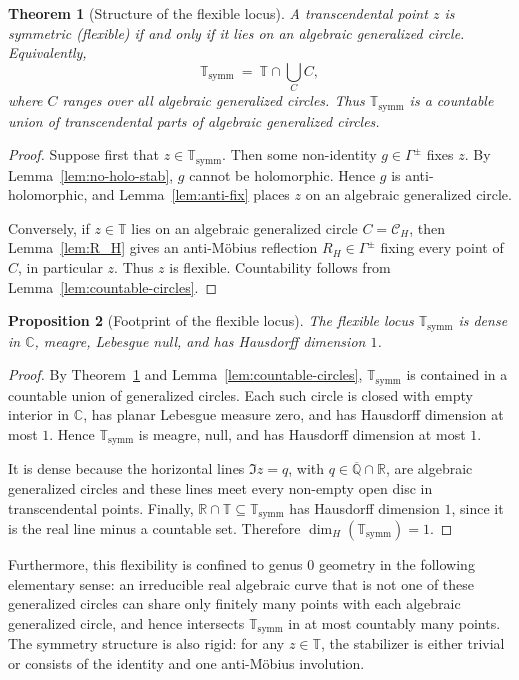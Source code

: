 \documentclass[11pt,a4paper]{article}
\theoremstyle{plain}
\newtheorem{theorem}{Theorem}[section]
\newtheorem{proposition}[theorem]{Proposition}
\theoremstyle{definition}
\newcommand{\C}{\mathbb{C}}
\newcommand{\R}{\mathbb{R}}
\newcommand{\Alg}{\overline{\mathbb{Q}}}
\newcommand{\trans}{\mathbb{T}}
\newcommand{\Tc}{\trans}
\newcommand{\ssymm}{\Tc_{\mathrm{symm}}}
\begin{document}
\begin{theorem}[Structure of the flexible locus]\label{thm:symm-locus}
	A transcendental point $z$ is symmetric (flexible) if and only if it lies on an algebraic generalized circle. Equivalently,
	\[
		\ssymm \ = \ \Tc\cap\bigcup_C C,
	\]
	where $C$ ranges over all algebraic generalized circles. Thus $\ssymm$ is a countable union of transcendental parts of algebraic generalized circles.
\end{theorem}
\begin{proof}
	Suppose first that $z\in\ssymm$. Then some non-identity $g\in\Gamma^{\pm}$ fixes $z$. By Lemma~\ref{lem:no-holo-stab}, $g$ cannot be holomorphic. Hence $g$ is anti-holomorphic, and Lemma~\ref{lem:anti-fix} places $z$ on an algebraic generalized circle.
	
	Conversely, if $z\in\Tc$ lies on an algebraic generalized circle $C=\mathcal C_H$, then Lemma~\ref{lem:R_H} gives an anti-Möbius reflection $R_H\in\Gamma^{\pm}$ fixing every point of $C$, in particular $z$. Thus $z$ is flexible. Countability follows from Lemma~\ref{lem:countable-circles}.
\end{proof}

\begin{proposition}[Footprint of the flexible locus]\label{prop:flexible-footprint}
	The flexible locus $\ssymm$ is dense in $\C$, meagre, Lebesgue null, and has Hausdorff dimension $1$.
\end{proposition}
\begin{proof}
	By Theorem~\ref{thm:symm-locus} and Lemma~\ref{lem:countable-circles}, $\ssymm$ is contained in a countable union of generalized circles. Each such circle is closed with empty interior in $\C$, has planar Lebesgue measure zero, and has Hausdorff dimension at most $1$. Hence $\ssymm$ is meagre, null, and has Hausdorff dimension at most $1$.
	
	It is dense because the horizontal lines $\Im z=q$, with $q\in\Alg\cap\R$, are algebraic generalized circles and these lines meet every non-empty open disc in transcendental points. Finally, $\R\cap\Tc\subseteq\ssymm$ has Hausdorff dimension $1$, since it is the real line minus a countable set. Therefore $\dim_H(\ssymm)=1$.
\end{proof}

Furthermore, this flexibility is confined to genus 0 geometry in the following elementary sense: an irreducible real algebraic curve that is not one of these generalized circles can share only finitely many points with each algebraic generalized circle, and hence intersects $\ssymm$ in at most countably many points. The symmetry structure is also rigid: for any $z\in\Tc$, the stabilizer is either trivial or consists of the identity and one anti-Möbius involution.
\end{document}
